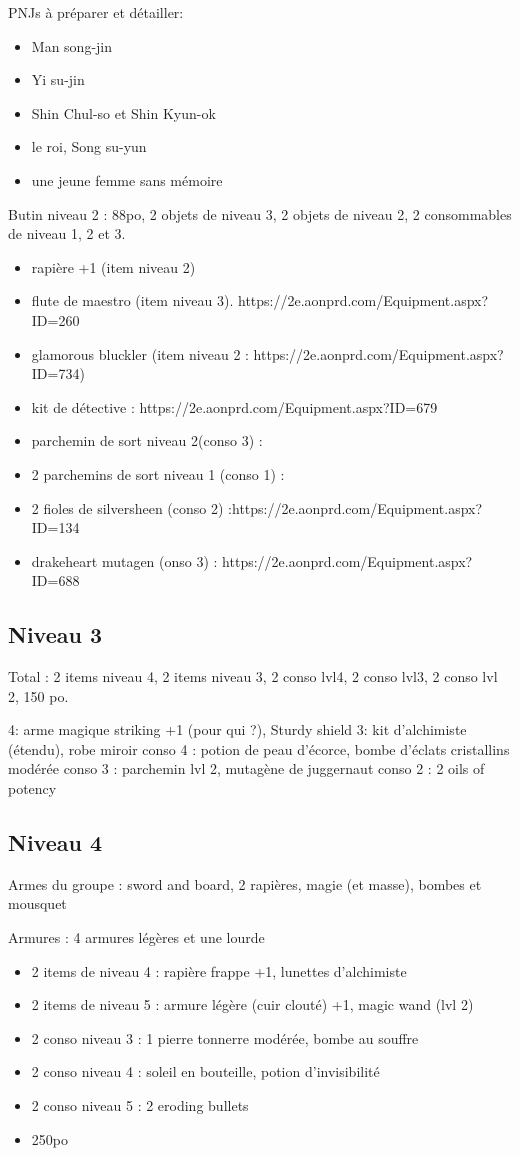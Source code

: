 \documentclass[10pt,a4paper]{book}
\begin{document}
PNJs à préparer et détailler:
\begin{itemize}
\item Man song-jin
\item Yi su-jin
\item Shin Chul-so et Shin Kyun-ok
\item le roi, Song su-yun
\item une jeune femme sans mémoire
\end{itemize}

Butin niveau 2 : 88po, 2 objets de niveau 3, 2 objets de niveau 2, 2 consommables de niveau 1, 2 et 3. 
\begin{itemize}
\item rapière +1 (item niveau 2)
\item flute de maestro (item niveau 3). https://2e.aonprd.com/Equipment.aspx?ID=260
\item glamorous bluckler (item niveau 2 : https://2e.aonprd.com/Equipment.aspx?ID=734)
\item kit de détective : https://2e.aonprd.com/Equipment.aspx?ID=679
\item parchemin de sort niveau 2(conso 3) :
\item 2 parchemins de sort niveau 1 (conso 1) :
\item 2 fioles de silversheen (conso 2) :https://2e.aonprd.com/Equipment.aspx?ID=134
\item drakeheart mutagen (onso 3) : https://2e.aonprd.com/Equipment.aspx?ID=688
\end{itemize}

\subsection{Niveau 3}
Total : 2 items niveau 4, 2 items niveau 3, 2 conso lvl4, 2 conso lvl3, 2 conso lvl 2, 150 po.

4: arme magique striking +1 (pour qui ?), Sturdy shield
3: kit d'alchimiste (étendu), robe miroir 
conso 4 : potion de peau d'écorce, bombe d'éclats cristallins modérée
conso 3 : parchemin lvl 2, mutagène de juggernaut
conso 2 : 2 oils of potency

\subsection{Niveau 4}
Armes du groupe :
sword and board, 2 rapières, magie (et masse), bombes et mousquet

Armures : 4 armures légères et une lourde
\begin{itemize}
\item 2 items de niveau 4 : rapière frappe +1, lunettes d'alchimiste
\item 2 items de niveau 5 : armure légère (cuir clouté) +1, magic wand (lvl 2)
\item 2 conso niveau 3 : 1 pierre tonnerre modérée, bombe au souffre
\item 2 conso niveau 4 : soleil en bouteille, potion d'invisibilité
\item 2 conso niveau 5 : 2 eroding bullets 
\item 250po
\end{itemize}
\end{document}
